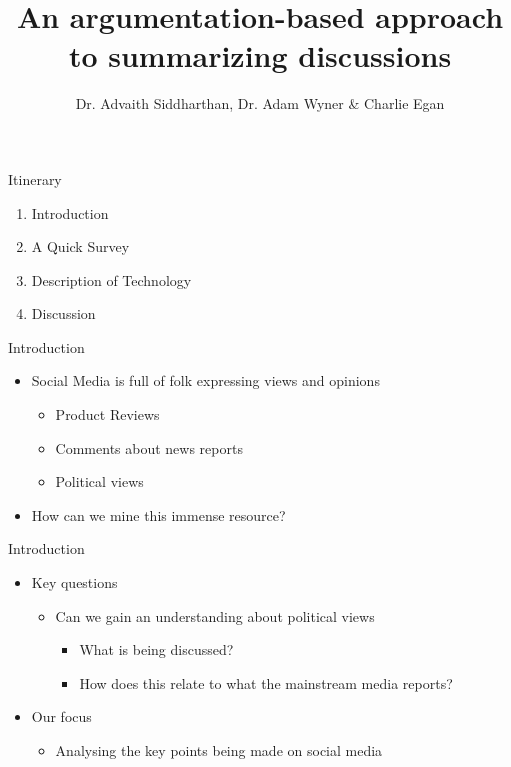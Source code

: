 \documentclass{beamer}
\title{An argumentation-based approach to summarizing discussions}
\date{}
\author{Dr. Advaith Siddharthan, Dr. Adam Wyner \& Charlie Egan}
\institute{University of Aberdeen}
\begin{document}
  \maketitle
  \begin{frame}{Itinerary}
	\begin{enumerate}
	\item{Introduction}
	\item{A Quick Survey}
	\item{Description of Technology}
	\item{Discussion}
	\end{enumerate}
  \end{frame}


  \begin{frame}{Introduction}
	\begin{itemize}
	\item Social Media is full of folk expressing views and opinions
	  \begin{itemize}
	  \item Product Reviews
	  \item Comments about news reports
	  \item Political views
	  \end{itemize}
	\item How can we mine this immense resource?
	\end{itemize}
  \end{frame}

  \begin{frame}{Introduction}
	\begin{itemize}
	\item Key questions
	  \begin{itemize}
	  \item Can we gain an understanding about political views
		\begin{itemize}
		\item What is being discussed?
		\item How does this relate to what the mainstream media reports?
		\end{itemize}
	  \end{itemize}
	\item Our focus
	  \begin{itemize}
	  \item Analysing the key points being made on social media
	  \end{itemize}

	\end{itemize}
  \end{frame}
\end{document}
